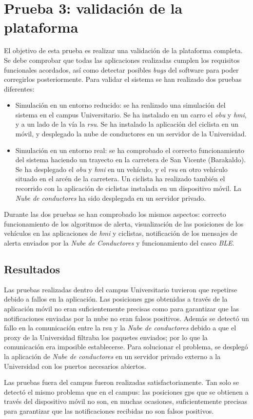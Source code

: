 \section{Prueba 3: validación de la plataforma}
El objetivo de esta prueba es realizar una validación de la plataforma
completa. Se debe comprobar que todas las aplicaciones realizadas
cumplen los requisitos funcionales acordados, así como detectar
posibles \emph{bugs} del software para poder corregirlos posteriormente.
Para validar el sistema se han realizado dos pruebas diferentes:

\begin{itemize}
	\item Simulación en un entorno reducido: se ha realizado una simulación
	del sistema en el campus Universitario. Se ha instalado en un carro el
	\emph{obu} y \emph{hmi}, y a un lado de la vía la \emph{rsu}. Se ha 
	instalado la aplicación del ciclista en un móvil, y desplegado la nube
	de conductores en un servidor de la Universidad.
	
	\item Simulación en un entorno real: se ha comprobado el correcto
	funcionamiento del sistema haciendo un trayecto en la carretera de
	San Vicente (Barakaldo). Se ha desplegado el \emph{obu} y \emph{hmi}
	en un vehículo,	y el \emph{rsu} en otro vehículo situado en el
	arcén de la carretera. Un ciclista ha realizado también el recorrido
	con la aplicación de ciclistas instalada en un dispositivo móvil. La
	\emph{Nube de conductores} ha sido desplegada en un servidor privado.
\end{itemize}

Durante las dos pruebas se han comprobado los mismos aspectos: correcto
funcionamiento de los algoritmos de alerta, visualización de las posiciones
de los vehículos en las aplicaciones de \emph{hmi} y ciclistas, notificación
de los mensajes de alerta enviados por la \emph{Nube de Conductores} y
funcionamiento del casco \emph{BLE}.

\subsection{Resultados}
Las pruebas realizadas dentro del campus Universitario tuvieron que repetirse
debido a fallos en la aplicación. Las posiciones \gls{gps} obtenidas a través
de la aplicación móvil no eran suficientemente precisas como para garantizar
que las notificaciones enviadas por la nube no eran falsos positivos. Además
se detectó un fallo en la comunicación entre la \gls{rsu} y la \emph{Nube de
conductores} debido a que el proxy de la Universidad filtraba los paquetes
enviados; por lo que la comunicación era imposible establecerse. Para solucionar
el problema, se desplegó la aplicación de \emph{Nube de conductores} en un
servidor privado externo a la Universidad con los puertos necesarios abiertos.

Las pruebas fuera del campus fueron realizadas satisfactoriamente. Tan solo
se detectó el mismo problema que en el campus: las posiciones \gls{gps}
que se obtienen a través del dispositivo móvil no son, en muchas ocasiones,
suficientemente precisas para garantizar que las notificaciones recibidas
no son falsos positivos.